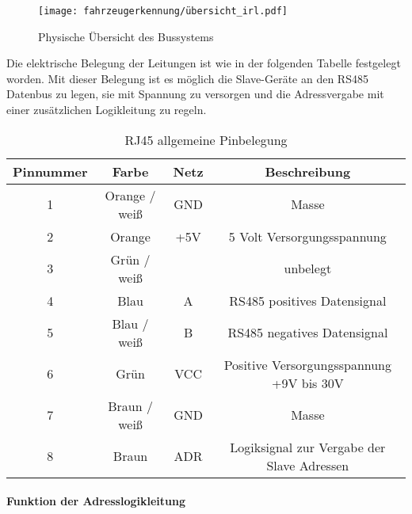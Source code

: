 \begin{figure}[H]
    \centering
    \texttt{[image: fahrzeugerkennung/übersicht\_irl.pdf]}
    \caption{Physische Übersicht des Bussystems}
\end{figure}

Die elektrische Belegung der Leitungen ist wie in der folgenden Tabelle festgelegt worden. Mit dieser Belegung ist es möglich die Slave-Geräte an den RS485 Datenbus zu legen,
sie mit Spannung zu versorgen und die Adressvergabe mit einer zusätzlichen Logikleitung zu regeln. 

\begin{table}[h]
    \centering
    \begin{tabular}{|c|c|c|c|}
        \hline
        \textbf{Pinnummer} & \textbf{Farbe} & \textbf{Netz} & \textbf{Beschreibung}                      \\ \hline
        1                  & Orange / weiß  & GND           & Masse                                      \\ \hline
        2                  & Orange         & +5V           & 5 Volt Versorgungsspannung                 \\ \hline
        3                  & Grün / weiß    &               & unbelegt                                   \\ \hline
        4                  & Blau           & A             & RS485 positives Datensignal                \\ \hline
        5                  & Blau / weiß    & B             & RS485 negatives Datensignal                \\ \hline
        6                  & Grün           & VCC           & Positive Versorgungsspannung +9V bis 30V   \\ \hline
        7                  & Braun / weiß   & GND           & Masse                                      \\ \hline
        8                  & Braun          & ADR           & Logiksignal zur Vergabe der Slave Adressen \\ \hline
    \end{tabular}
    \caption{RJ45 allgemeine Pinbelegung}
\end{table}

\paragraph{Funktion der Adresslogikleitung}\mbox{}\\

